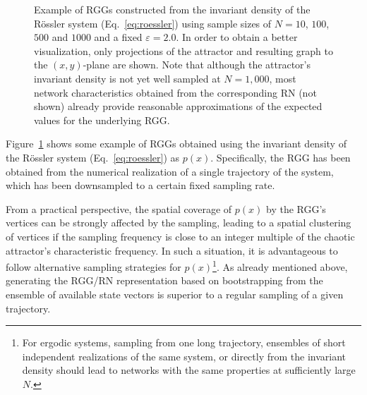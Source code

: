 \documentclass[graybox]{svmult}
\begin{document}
\begin{figure}
\caption{Example of RGGs constructed from the invariant density of the R\"ossler system (Eq.~\ref{eq:roessler}) using sample sizes of $N=10$, $100$, $500$ and $1000$ and a fixed $\varepsilon=2.0$. In order to obtain a better visualization, only projections of the attractor and resulting graph to the $(x,y)$-plane are shown. Note that although the attractor's invariant density is not yet well sampled at $N=1,000$, most network characteristics obtained from the corresponding RN (not shown) already provide reasonable approximations of the expected values for the underlying RGG.}
\label{fig:roessler_rgg}
\end{figure}

Figure~\ref{fig:roessler_rgg} shows some example of RGGs obtained using the invariant density of the R\"ossler system (Eq.~\ref{eq:roessler}) as $p(x)$. Specifically, the RGG has been obtained from the numerical realization of a single trajectory of the system, which has been downsampled to a certain fixed sampling rate. 

From a practical perspective, the spatial coverage of $p(x)$ by the RGG's vertices can be strongly affected by the sampling, leading to a spatial clustering of vertices if the sampling frequency is close to an integer multiple of the chaotic attractor's characteristic frequency. In such a situation, it is advantageous to follow alternative sampling strategies for $p(x)$\footnote{For ergodic systems, sampling from one long trajectory, ensembles of short independent realizations of the same system, or directly from the invariant density should lead to networks with the same properties at sufficiently large $N$.}. As already mentioned above, generating the RGG/RN representation based on bootstrapping from the ensemble of available state vectors is superior to a regular sampling of a given trajectory.
\end{document}
